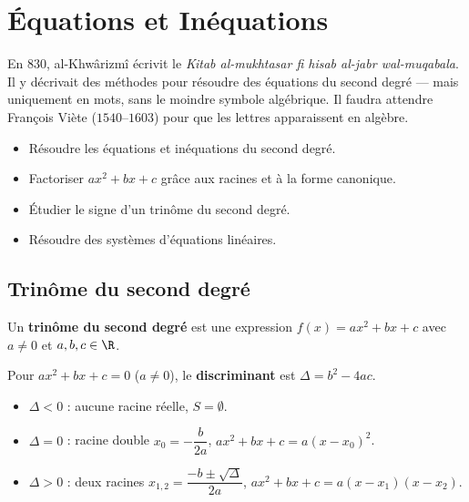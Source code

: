 \chapter{\'Equations et In\'equations}


\begin{anecdote}
En $830$, al-Khw\^{a}rizm\^{i} \'ecrivit le \textit{Kitab al-mukhtasar fi hisab
al-jabr wal-muqabala}. Il y d\'ecrivait des m\'ethodes pour r\'esoudre des \'equations
du second degr\'e --- mais uniquement en mots, sans le moindre symbole alg\'ebrique.
Il faudra attendre Fran\c{c}ois Vi\`ete ($1540$--$1603$) pour que les lettres
apparaissent en alg\`ebre.
\end{anecdote}

\begin{objectifs}
\begin{itemize}
  \item R\'esoudre les \'equations et in\'equations du second degr\'e.
  \item Factoriser $ax^2+bx+c$ gr\^ace aux racines et \`a la forme canonique.
  \item \'Etudier le signe d'un trin\^{o}me du second degr\'e.
  \item R\'esoudre des syst\`emes d'\'equations lin\'eaires.
\end{itemize}
\end{objectifs}

\section{Trin\^{o}me du second degr\'e}

\begin{defn}[Trin\^{o}me]
Un \textbf{trin\^{o}me du second degr\'e} est une expression $f(x) = ax^2+bx+c$
avec $a \ne 0$ et $a,b,c \in \R$.
\end{defn}

\begin{thm}[Discriminant]
Pour $ax^2+bx+c=0$ ($a \ne 0$), le \textbf{discriminant} est $\Delta = b^2-4ac$.
\begin{itemize}
  \item $\Delta < 0$ : aucune racine r\'eelle, $S = \emptyset$.
  \item $\Delta = 0$ : racine double $x_0 = -\dfrac{b}{2a}$,\quad
        $ax^2+bx+c = a(x-x_0)^2$.
  \item $\Delta > 0$ : deux racines
        $x_{1,2} = \dfrac{-b \pm \sqrt{\Delta}}{2a}$,\quad
        $ax^2+bx+c = a(x-x_1)(x-x_2)$.
\end{itemize}
\end{thm}

